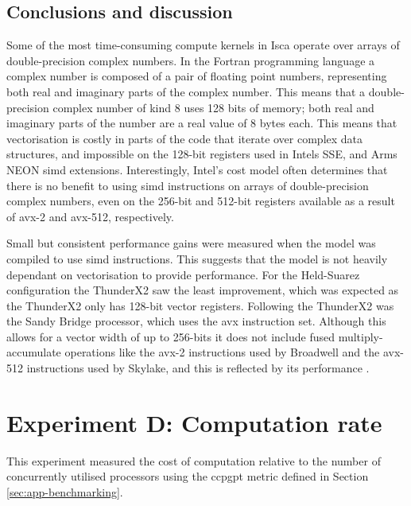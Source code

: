\documentclass[a4paper,11pt]{report}
\begin{document}
\subsection{Conclusions and discussion}
Some of the most time-consuming compute kernels in Isca operate over arrays of double-precision complex numbers. In the Fortran programming language a complex number is composed of a pair of floating point numbers, representing both real and imaginary parts of the complex number. This means that a double-precision complex number of kind 8 uses 128 bits of memory; both real and imaginary parts of the number are a real value of 8 bytes each. This means that vectorisation is costly in parts of the code that iterate over complex data structures, and impossible on the 128-bit registers used in Intels SSE, and Arms NEON \gls{simd} extensions. Interestingly, Intel's cost model often determines that there is no benefit to using \gls{simd} instructions on arrays of double-precision complex numbers, even on the 256-bit and 512-bit registers available as a result of \gls{avx}-2 and \gls{avx}-512, respectively.
\par
Small but consistent performance gains were measured when the model was compiled to use \gls{simd} instructions. This suggests that the model is not heavily dependant on vectorisation to provide performance. For the Held-Suarez configuration the ThunderX2 saw the least improvement, which was expected as the ThunderX2 only has 128-bit vector registers. Following the ThunderX2 was the Sandy Bridge processor, which uses the \gls{avx} instruction set. Although this allows for a vector width of up to 256-bits it does not include fused multiply-accumulate operations like the \gls{avx}-2 instructions used by Broadwell and the \gls{avx}-512 instructions used by Skylake, and this is reflected by its performance \cite{reinders2013intel, intel2017avx}.



\section{Experiment D: Computation rate}
This experiment measured the cost of computation relative to the number of concurrently utilised processors using the \gls{ccpgpt} metric defined in Section \ref{sec:app-benchmarking}. %
\label{sec:comm-analysis}
\end{document}
